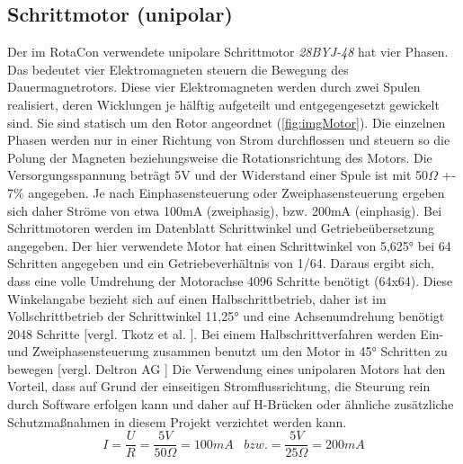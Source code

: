 \documentclass[11pt, titlepage, fleqn]{report}
\begin{document}
			\subsection*{Schrittmotor (unipolar)}
			\label{sec:Motor}
				Der im RotaCon verwendete unipolare Schrittmotor \textit{28BYJ-48} hat vier Phasen. Das bedeutet vier Elektromagneten steuern die Bewegung des Dauermagnetrotors. Diese vier Elektromagneten werden durch zwei Spulen realisiert, deren Wicklungen je hälftig aufgeteilt und entgegengesetzt gewickelt sind. Sie sind statisch um den Rotor angeordnet (\ref{fig:imgMotor}). Die einzelnen Phasen werden nur in einer Richtung von Strom durchflossen und steuern so die Polung der Magneten beziehungsweise die Rotationsrichtung des Motors. Die Versorgungsspannung beträgt 5V und der Widerstand einer Spule ist mit 50$\Omega$ +- 7\% angegeben. Je nach Einphasensteuerung oder Zweiphasensteuerung ergeben sich daher Ströme von etwa 100mA (zweiphasig), bzw. 200mA (einphasig). Bei Schrittmotoren werden im Datenblatt Schrittwinkel und Getriebeübersetzung angegeben. Der hier verwendete Motor hat einen Schrittwinkel von 5,625° bei 64 Schritten angegeben und ein Getriebeverhältnis von 1/64. Daraus ergibt sich, dass eine volle Umdrehung der Motorachse 4096 Schritte benötigt (64x64). Diese Winkelangabe bezieht sich auf einen Halbschrittbetrieb, daher ist im Vollschrittbetrieb der Schrittwinkel 11,25° und eine Achsenumdrehung benötigt 2048 Schritte [vergl. Tkotz et al. \cite[S.641]{Winkelberechnung}]. Bei einem Halbschrittverfahren werden Ein- und Zweiphasensteuerung zusammen benutzt um den Motor in 45° Schritten zu bewegen [vergl. Deltron AG \cite{Schrittmotor_Steuerung}] Die Verwendung eines unipolaren Motors hat den Vorteil, dass auf Grund der einseitigen Stromflussrichtung, die Steurung rein durch Software erfolgen kann und daher auf H-Brücken oder ähnliche zusätzliche Schutzmaßnahmen in diesem Projekt verzichtet werden kann.
				\begin{equation}
					I=\frac{U}{R}=\frac{5V}{50\Omega} = 100mA \hspace{10pt} bzw. = \frac{5V}{25\Omega} = 200mA
				\end{equation}
\end{document}
